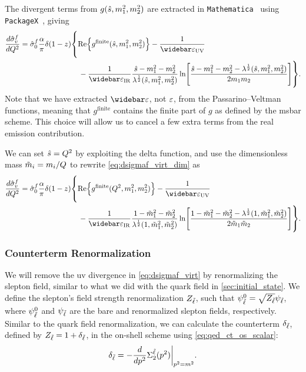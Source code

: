 The divergent terms from $g(\hat{s},m_1^2,m_2^2)$ are extracted in \texttt{Mathematica}~\cite{Mathematica} using \texttt{PackageX}~\cite{Patel:2015tea,Patel:2016fam}, giving
\begin{equation}
\begin{split}
    \frac{d\hat\sigma^f_v}{dQ^2} = 
    \hat\sigma^f_0 \frac{\alpha}{\pi} \delta(1-z)
    &\vastl\{
        \Re\Bigl\{ g^{\mathrm{finite}}(\shat,m_1^2,m_2^2) \Bigr\}
        -\frac{1}{\barepsUV}
        \\ &\quad
        - \frac{1}{\barepsIR} \frac{\shat-m_1^2-m_2^2}{\lambda^{\frac{1}{2}}(\shat,m_1^2,m_2^2)} \ln\Biggl[
            \frac{\shat-m_1^2-m_2^2-\lambda^{\frac{1}{2}}(\shat,m_1^2,m_2^2)}{2m_1m_2}
        \Biggr]
    \vastr\}.
\end{split}
\label{eq:dsigmaf_virt_dim}
\end{equation}
Note that we have extracted $\bareps$, not $\varepsilon$, from the Passarino--Veltman functions, meaning that $g^{\mathrm{finite}}$ contains the finite part of $g$ as defined by the \gls{msbar} scheme.
This choice will allow us to cancel a few extra terms from the real emission contribution.

We can set $\hat{s}=Q^2$ by exploiting the delta function, and use the dimensionless mass $\tilde{m}_i=m_i/Q$ to rewrite \cref{eq:dsigmaf_virt_dim} as
\begin{equation}
\begin{split}
    \frac{d\hat\sigma^f_v}{dQ^2} =
    \hat\sigma^f_0 \frac{\alpha}{\pi} \delta(1-z)
    &\vastl\{
        \Re\Bigl\{ g^{\mathrm{finite}}(Q^2,m_1^2,m_2^2) \Bigr\}
        -\frac{1}{\barepsUV}
        \\ &\quad
        - \frac{1}{\barepsIR} \frac{1-\mt_1^2-\mt_2^2}{\lambda^{\frac{1}{2}}(1,\mt_1^2,\mt_2^2)} \ln\Biggl[
            \frac{1-\mt_1^2-\mt_2^2-\lambda^{\frac{1}{2}}(1,\mt_1^2,\mt_2^2)}{2\mt_1\mt_2}
        \Biggr]
    \vastr\}.
\end{split}
\label{eq:dsigmaf_virt}
\end{equation}

\subsubsection{Counterterm Renormalization}
We will remove the \gls{uv} divergence in \cref{eq:dsigmaf_virt} by renormalizing the slepton field, similar to what we did with the quark field in \cref{sec:initial_state}.
We define the slepton's field strength renormalization $Z_{\tilde{\ell}}$, such that $\psi_{\tilde{\ell}}^0=\sqrt{Z_{\tilde{\ell}}}\psi_{\tilde{\ell}}$, where $\psi_{\tilde{\ell}}^0$ and $\psi_{\tilde{\ell}}$ are the bare and renormalized slepton fields, respectively. Similar to the quark field renormalization, we can calculate the counterterm $\delta_{\tilde{\ell}}$, defined by $Z_{\tilde{\ell}}=1+\delta_{\tilde{\ell}}$, in the on-shell scheme using \cref{eq:qed_ct_os_scalar}:
\begin{equation}
    \delta_{\tilde{\ell}} = -\frac{d}{dp^2} \Sigma^{\tilde{\ell}}_2(p^2) \biggr\vert_{p^2 = m^2}.
    \label{eq:deltal_def}
\end{equation}

